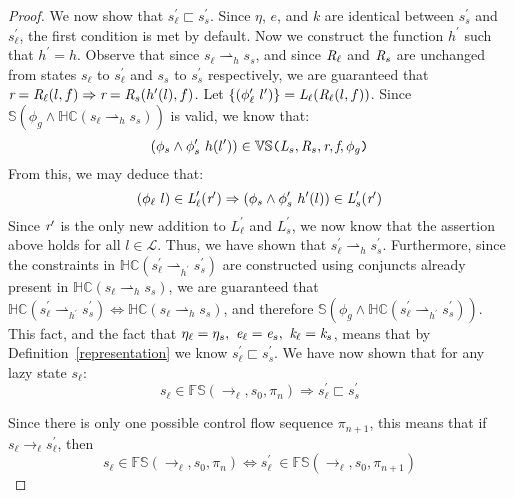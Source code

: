 \begin{proof}
We now show that $s_\ell^\prime \sqsubset s_s^\prime$. Since $\eta$, $e$, and $k$ are identical between $s_s^\prime$ and $s_\ell^\prime $, the first condition is met by default. Now we construct the function $h^\prime$ such that $h^\prime = h$. Observe that since $s_\ell \rightharpoonup_{h} s_s$, and since $\emph{R}_\ell$ and $\emph{R}_s$ are unchanged from states $s_\ell$ to $s_\ell^\prime$ and $s_s$ to $s_s^\prime$ respectively, we are guaranteed that $ \emph{r} = \emph{R}_\ell(l,f) \Rightarrow \emph{r} = \emph{R}_s(h^\prime(l),f)$. Let $\{(\phi_\ell^\prime\ l^\prime)\} =  \emph{L}_\ell(\emph{R}_\ell(l,f))$. Since $\mathbb{S}(\phi_g \wedge \mathbb{HC}(s_\ell \rightharpoonup_{h} s_s))$ is valid, we know that:
 $$(\phi_s \wedge \phi_s^\prime\ h(l^\prime)) \in \mathbb{VS}\texttt{(} \emph{L}_{s},\emph{R}_{s},\emph{r},\emph{f},\phi_g\texttt{)}$$ 
From this, we may deduce that:
$$ (\phi_\ell\ l) \in \emph{L}_\ell^\prime(\emph{r}^\prime) \Rightarrow (\phi_s \wedge \phi_s^\prime\ h^\prime(l))\in \emph{L}_s^\prime(\emph{r}^\prime)$$
Since $\emph{r}^\prime$ is the only new addition to $L_\ell^\prime$ and $L_s^\prime$, we now know that the assertion above holds for all $l \in \mathcal{L}$. Thus, we have shown that $s_\ell^\prime \rightharpoonup_{h} s_s^\prime$. Furthermore, since the constraints in $\mathbb{HC}(s_\ell^\prime \rightharpoonup_{h^\prime} s_s^\prime)$ are constructed using conjuncts already present in $ \mathbb{HC}(s_\ell \rightharpoonup_{h} s_s)$, we are guaranteed that $\mathbb{HC}(s_\ell^\prime \rightharpoonup_{h^\prime} s_s^\prime) \Leftrightarrow \mathbb{HC}(s_\ell \rightharpoonup_{h} s_s)$, and therefore $\mathbb{S}(\phi_g \wedge \mathbb{HC}(s_\ell^\prime \rightharpoonup_{h^\prime} s_s^\prime))$. This fact, and the fact that $\eta_{\ell} = \eta_{s} ,\ \emph{e}_{\ell} = \emph{e}_{s} ,\ \emph{k}_{\ell} = \emph{k}_{s}$, means that by Definition~\ref{representation} we know $s_\ell^\prime \sqsubset s_s^\prime$. We have now shown that for any lazy state $s_\ell$: 
\begin{equation}
\label{eqn:slimpliesslprime}
s_\ell \in \mathbb{FS}(\rightarrow_{\ell},s_0,\pi_n) \Rightarrow s_\ell^\prime \sqsubset s_s^\prime
\end{equation}

Since there is only one possible control flow sequence $\pi_{n+1}$, this means that if $s_\ell \rightarrow_\ell s_\ell^\prime$, then 
\begin{equation}
\label{eqn:slimpliesslprime2}
s_\ell \in \mathbb{FS}(\rightarrow_{\ell},s_0,\pi_n) \Leftrightarrow s_\ell^\prime\ \in \mathbb{FS}(\rightarrow_{\ell},s_0,\pi_{n+1})
\end{equation}


\end{proof}
